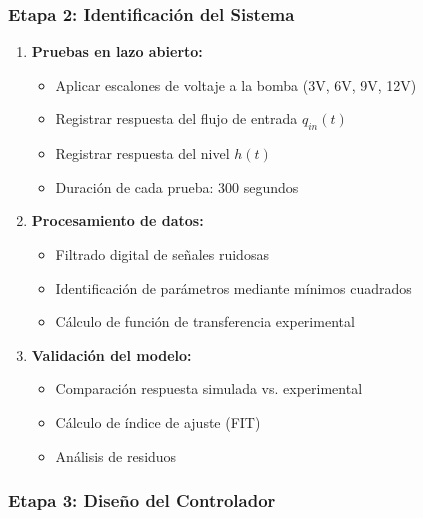 \documentclass[conference]{IEEEtran}
\begin{document}
\subsubsection{Etapa 2: Identificación del Sistema}

\begin{enumerate}
\item \textbf{Pruebas en lazo abierto:}
\begin{itemize}
\item Aplicar escalones de voltaje a la bomba (3V, 6V, 9V, 12V)
\item Registrar respuesta del flujo de entrada $q_{in}(t)$
\item Registrar respuesta del nivel $h(t)$
\item Duración de cada prueba: 300 segundos
\end{itemize}

\item \textbf{Procesamiento de datos:}
\begin{itemize}
\item Filtrado digital de señales ruidosas
\item Identificación de parámetros mediante mínimos cuadrados
\item Cálculo de función de transferencia experimental
\end{itemize}

\item \textbf{Validación del modelo:}
\begin{itemize}
\item Comparación respuesta simulada vs. experimental
\item Cálculo de índice de ajuste (FIT)
\item Análisis de residuos
\end{itemize}
\end{enumerate}

\subsubsection{Etapa 3: Diseño del Controlador}
\end{document}
